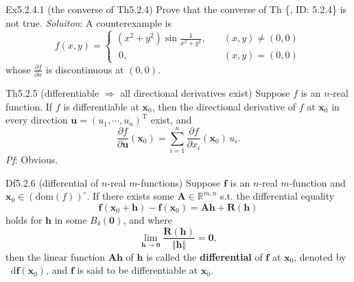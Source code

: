 \documentclass{article}
\newcommand{\parfrac}[2]{\frac{\partial #1}{\partial #2}}
\newcommand{\dif}{\mathop{}\!\mathrm{d}}
\begin{document}
\begin{Th}{Ex5.2.4.1 (the converse of Th5.2.4)}
    Prove that the converse of Th \{, ID: 5.2.4\} is not true.
    \tcblower
    \textit{Soluiton}: A counterexample is
    $$ f(x,y) = \begin{cases}
        (x^2+y^2)\sin\frac{1}{x^2+y^2},\quad &(x,y)\neq (0,0)\\
        \;0, \quad &(x,y) = (0,0)
    \end{cases}
    $$
    whose $\parfrac{f}{x}$ is discontinuous at $(0,0)$.
\end{Th}

\begin{Th}{Th5.2.5 (differentiable $\Rightarrow$ all directional derivatives exist)}
    Suppose $f$ is an $n$-real function. If $f$ is differentiable at $\pmb{x}_0$, then the directional derivative of $f$ at $\pmb{x}_0$ in every direction $\pmb{u} = (u_1, \cdots, u_n)^\mathrm{T}$ exist, and
    $$ \parfrac{f}{\pmb{u}}(\pmb{x}_0) = \sum_{i=1}^{n} \parfrac{f}{x_i}(\pmb{x}_0)\,u_i. $$
    \tcblower
    \textit{Pf}: Obvious.
\end{Th}

\begin{Df}{Df5.2.6 (differential of $n$-real $m$-functions)}
    Suppose $\pmb{f}$ is an $n$-real $m$-function and $\pmb{x}_0\in (\text{dom}(f))^\circ$. If there exists some $\pmb{A}\in\mathbb{R}^{m,n}$ s.t. the differential equality
    $$ \pmb{f}(\pmb{x}_0 + \pmb{h}) - \pmb{f}(\pmb{x}_0) = \pmb{Ah} + \pmb{R}(\pmb{h}) $$
    holds for $\pmb{h}$ in some $B_\delta(\pmb{0})$, and where 
    $$\lim_{\pmb{h}\to \pmb{0}}\frac{\pmb{R}(\pmb{h})}{\Vert \pmb{h}\Vert} = \pmb{0},$$
    then the linear function $\pmb{Ah}$ of $\pmb{h}$ is called the \textbf{differential} of $\pmb{f}$ at $\pmb{x}_0$, denoted by $\dif \pmb{f}(\pmb{x}_0)$, and $\pmb{f}$ is said to be differentiable at $\pmb{x}_0$.
\end{Df}
\end{document}
